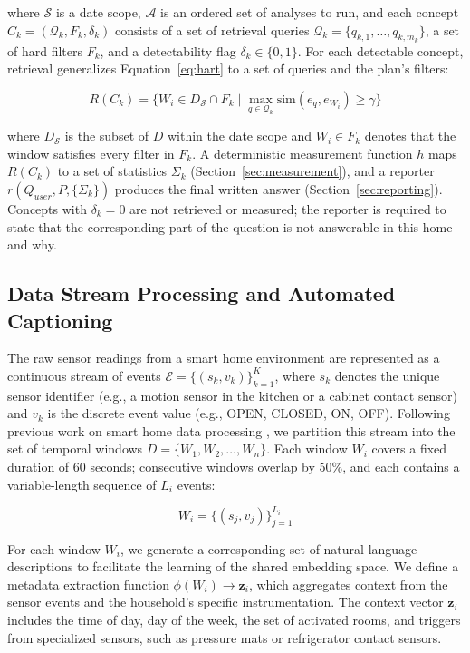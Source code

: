 where $\mathcal{S}$ is a date scope, $\mathcal{A}$ is an ordered set of analyses to run, and each concept $C_k = (\mathcal{Q}_k, F_k, \delta_k)$ consists of a set of retrieval queries $\mathcal{Q}_k = \{q_{k,1}, \dots, q_{k,m_k}\}$, a set of hard filters $F_k$, and a detectability flag $\delta_k \in \{0, 1\}$. For each detectable concept, retrieval generalizes Equation~\ref{eq:hart} to a set of queries and the plan's filters:

\begin{equation}
R(C_k) = \Big\{ W_i \in D_{\mathcal{S}} \cap F_k \;\Big|\; \max_{q \in \mathcal{Q}_k} \text{sim}(e_q, e_{W_i}) \geq \gamma \Big\}
\label{eq:concept_retrieval}
\end{equation}

where $D_{\mathcal{S}}$ is the subset of $D$ within the date scope and $W_i \in F_k$ denotes that the window satisfies every filter in $F_k$. A deterministic measurement function $h$ maps $R(C_k)$ to a set of statistics $\Sigma_k$ (Section~\ref{sec:measurement}), and a reporter $r(Q_{user}, P, \{\Sigma_k\})$ produces the final written answer (Section~\ref{sec:reporting}). Concepts with $\delta_k = 0$ are not retrieved or measured; the reporter is required to state that the corresponding part of the question is not answerable in this home and why.


\subsection{Data Stream Processing and Automated Captioning}
\label{sec:data_processing}

The raw sensor readings from a smart home environment are represented as a continuous stream of events $\mathcal{E} = \{ (s_k, v_k) \}_{k=1}^K$, where $s_k$ denotes the unique sensor identifier (e.g., a motion sensor in the kitchen or a cabinet contact sensor) and $v_k$ is the discrete event value (e.g., OPEN, CLOSED, ON, OFF). Following previous work on smart home data processing \cite{civitarese2025_adl_llm}, we partition this stream into the set of temporal windows $D = \{W_1, W_2, \dots, W_n\}$. Each window $W_i$ covers a fixed duration of 60 seconds; consecutive windows overlap by 50\%, and each contains a variable-length sequence of $L_i$ events:

\begin{equation}
W_i = \{ (s_j, v_j) \}_{j=1}^{L_i}
\end{equation}

For each window $W_i$, we generate a corresponding set of natural language descriptions to facilitate the learning of the shared embedding space. We define a metadata extraction function $\phi(W_i) \rightarrow \mathbf{z}_i$, which aggregates context from the sensor events and the household's specific instrumentation. The context vector $\mathbf{z}_i$ includes the time of day, day of the week, the set of activated rooms, and triggers from specialized sensors, such as pressure mats or refrigerator contact sensors.

